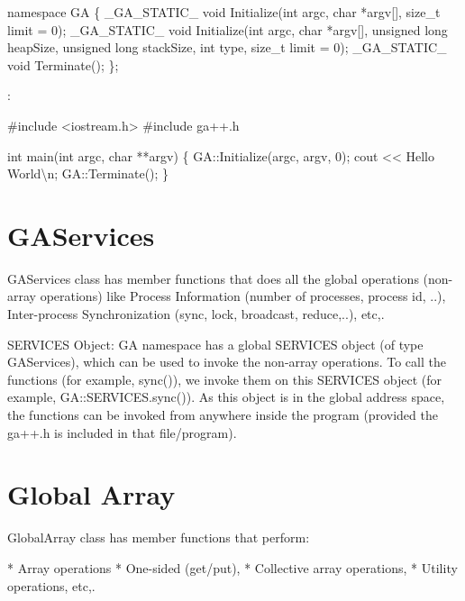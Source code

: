namespace GA \{ \_GA\_STATIC\_ void Initialize(int argc, char {*}argv{[}{]},
size\_t limit = 0); \_GA\_STATIC\_ void Initialize(int argc, char
{*}argv{[}{]}, unsigned long heapSize, unsigned long stackSize, int
type, size\_t limit = 0); \_GA\_STATIC\_ void Terminate(); \};

\emph{}: 

\#include <iostream.h> \#include \textquotedbl{}ga++.h\textquotedbl{}

int main(int argc, char {*}{*}argv) \{ GA::Initialize(argc, argv,
0); cout <\textcompwordmark{}< \textquotedbl{}Hello World\textbackslash{}n\textquotedbl{};
GA::Terminate(); \} 


\section{GAServices}

GAServices class has member functions that does all the global operations
(non-array operations) like Process Information (number of processes,
process id, ..), Inter-process Synchronization (sync, lock, broadcast,
reduce,..), etc,.

SERVICES Object: GA namespace has a global \textquotedbl{}SERVICES\textquotedbl{}
object (of type \textquotedbl{}GAServices\textquotedbl{}), which can
be used to invoke the non-array operations. To call the functions
(for example, sync()), we invoke them on this SERVICES object (for
example, GA::SERVICES.sync()). As this object is in the global address
space, the functions can be invoked from anywhere inside the program
(provided the ga++.h is included in that file/program). 


\section{Global Array}

GlobalArray class has member functions that perform:

{*} Array operations {*} One-sided (get/put), {*} Collective array
operations, {*} Utility operations, etc,. 
